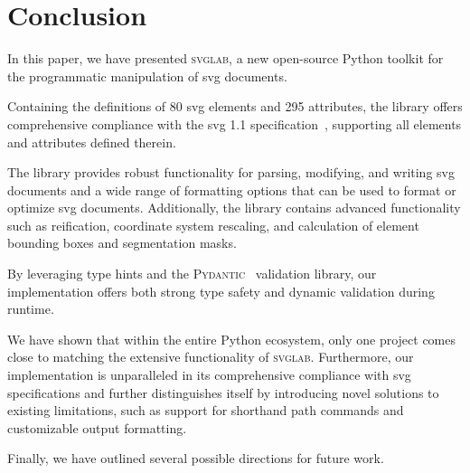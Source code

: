 \chapter{Conclusion}\label{chap:conclusion}

In this paper, we have presented \textsc{svglab}, a new open-source Python toolkit for the programmatic manipulation of \gls{svg} documents.

Containing the definitions of 80 \gls{svg} elements and 295 attributes, the library offers comprehensive compliance with the \gls{svg} 1.1 specification~\cite{svg11}, supporting all elements and attributes defined therein. 

The library provides robust functionality for parsing, modifying, and writing \gls{svg} documents and a wide range of formatting options that can be used to format or optimize \gls{svg} documents. Additionally, the library contains advanced functionality such as reification, coordinate system rescaling, and calculation of element bounding boxes and segmentation masks.

By leveraging type hints and the \textsc{Pydantic}~\cite{pydantic} validation library, our implementation offers both strong type safety and dynamic validation during runtime.

We have shown that within the entire Python ecosystem, only one project comes close to matching the extensive functionality of \textsc{svglab}. Furthermore, our implementation is unparalleled in its comprehensive compliance with \gls{svg} specifications and further distinguishes itself by introducing novel solutions to existing limitations, such as support for shorthand path commands and customizable output formatting.

Finally, we have outlined several possible directions for future work.
